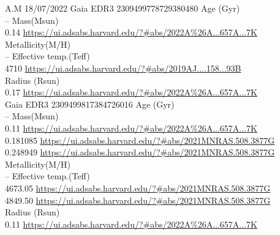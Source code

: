 A.M 18/07/2022
Gaia EDR3 2309499778729380480 
Age (Gyr)\\
--
Mass(Msun)\\
0.14 \url{https://ui.adsabs.harvard.edu/?#abs/2022A%26A...657A...7K}\\
Metallicity(M/H)\\
--
Effective temp.(Teff)\\
4710 \url{https://ui.adsabs.harvard.edu/?#abs/2019AJ....158...93B}\\
Radius (Rsun)\\
0.17 \url{https://ui.adsabs.harvard.edu/?#abs/2022A%26A...657A...7K}\\
Gaia EDR3 2309499817384726016
Age (Gyr)\\
--
Mass(Msun)\\
0.11 \url{https://ui.adsabs.harvard.edu/?#abs/2022A%26A...657A...7K}\\
0.181085 \url{https://ui.adsabs.harvard.edu/?#abs/2021MNRAS.508.3877G}\\
0.248949 \url{https://ui.adsabs.harvard.edu/?#abs/2021MNRAS.508.3877G}\\
Metallicity(M/H)\\
--
Effective temp.(Teff)\\
4673.05 \url{https://ui.adsabs.harvard.edu/?#abs/2021MNRAS.508.3877G}\\
4849.50 \url{https://ui.adsabs.harvard.edu/?#abs/2021MNRAS.508.3877G}\\
Radius (Rsun)\\
0.11 \url{https://ui.adsabs.harvard.edu/?#abs/2022A%26A...657A...7K}\\